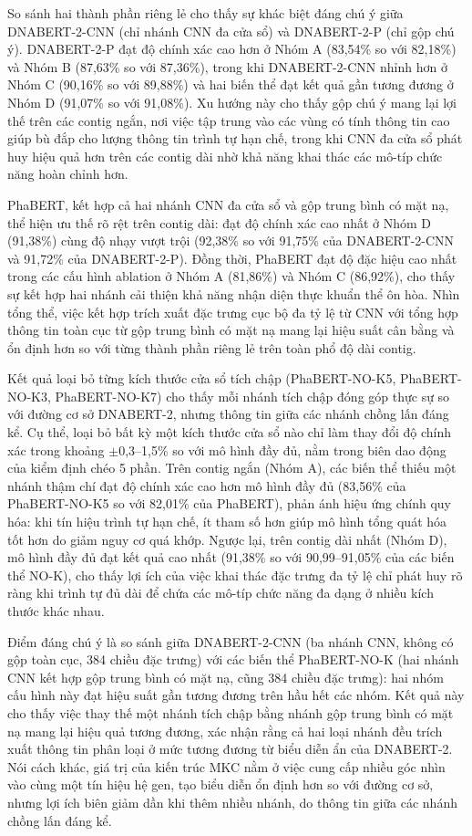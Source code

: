 So sánh hai thành phần riêng lẻ cho thấy sự khác biệt đáng chú ý giữa DNABERT-2-CNN (chỉ nhánh CNN đa cửa sổ) và DNABERT-2-P (chỉ gộp chú ý). DNABERT-2-P đạt độ chính xác cao hơn ở Nhóm A (83,54\% so với 82,18\%) và Nhóm B (87,63\% so với 87,36\%), trong khi DNABERT-2-CNN nhỉnh hơn ở Nhóm C (90,16\% so với 89,88\%) và hai biến thể đạt kết quả gần tương đương ở Nhóm D (91,07\% so với 91,08\%). Xu hướng này cho thấy gộp chú ý mang lại lợi thế trên các contig ngắn, nơi việc tập trung vào các vùng có tính thông tin cao giúp bù đắp cho lượng thông tin trình tự hạn chế, trong khi CNN đa cửa sổ phát huy hiệu quả hơn trên các contig dài nhờ khả năng khai thác các mô-típ chức năng hoàn chỉnh hơn.

PhaBERT, kết hợp cả hai nhánh CNN đa cửa sổ và gộp trung bình có mặt nạ, thể hiện ưu thế rõ rệt trên contig dài: đạt độ chính xác cao nhất ở Nhóm D (91,38\%) cùng độ nhạy vượt trội (92,38\% so với 91,75\% của DNABERT-2-CNN và 91,72\% của DNABERT-2-P). Đồng thời, PhaBERT đạt độ đặc hiệu cao nhất trong các cấu hình ablation ở Nhóm A (81,86\%) và Nhóm C (86,92\%), cho thấy sự kết hợp hai nhánh cải thiện khả năng nhận diện thực khuẩn thể ôn hòa. Nhìn tổng thể, việc kết hợp trích xuất đặc trưng cục bộ đa tỷ lệ từ CNN với tổng hợp thông tin toàn cục từ gộp trung bình có mặt nạ mang lại hiệu suất cân bằng và ổn định hơn so với từng thành phần riêng lẻ trên toàn phổ độ dài contig.

Kết quả loại bỏ từng kích thước cửa sổ tích chập (PhaBERT-NO-K5, PhaBERT-NO-K3, PhaBERT-NO-K7) cho thấy mỗi nhánh tích chập đóng góp thực sự so với đường cơ sở DNABERT-2, nhưng thông tin giữa các nhánh chồng lấn đáng kể. Cụ thể, loại bỏ bất kỳ một kích thước cửa sổ nào chỉ làm thay đổi độ chính xác trong khoảng $\pm$0,3--1,5\% so với mô hình đầy đủ, nằm trong biên dao động của kiểm định chéo 5 phần. Trên contig ngắn (Nhóm A), các biến thể thiếu một nhánh thậm chí đạt độ chính xác cao hơn mô hình đầy đủ (83,56\% của PhaBERT-NO-K5 so với 82,01\% của PhaBERT), phản ánh hiệu ứng chính quy hóa: khi tín hiệu trình tự hạn chế, ít tham số hơn giúp mô hình tổng quát hóa tốt hơn do giảm nguy cơ quá khớp. Ngược lại, trên contig dài nhất (Nhóm D), mô hình đầy đủ đạt kết quả cao nhất (91,38\% so với 90,99--91,05\% của các biến thể NO-K), cho thấy lợi ích của việc khai thác đặc trưng đa tỷ lệ chỉ phát huy rõ ràng khi trình tự đủ dài để chứa các mô-típ chức năng đa dạng ở nhiều kích thước khác nhau.

Điểm đáng chú ý là so sánh giữa DNABERT-2-CNN (ba nhánh CNN, không có gộp toàn cục, 384 chiều đặc trưng) với các biến thể PhaBERT-NO-K (hai nhánh CNN kết hợp gộp trung bình có mặt nạ, cũng 384 chiều đặc trưng): hai nhóm cấu hình này đạt hiệu suất gần tương đương trên hầu hết các nhóm. Kết quả này cho thấy việc thay thế một nhánh tích chập bằng nhánh gộp trung bình có mặt nạ mang lại hiệu quả tương đương, xác nhận rằng cả hai loại nhánh đều trích xuất thông tin phân loại ở mức tương đương từ biểu diễn ẩn của DNABERT-2. Nói cách khác, giá trị của kiến trúc MKC nằm ở việc cung cấp nhiều góc nhìn vào cùng một tín hiệu hệ gen, tạo biểu diễn ổn định hơn so với đường cơ sở, nhưng lợi ích biên giảm dần khi thêm nhiều nhánh, do thông tin giữa các nhánh chồng lấn đáng kể.

